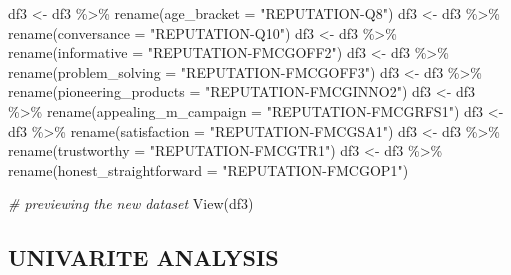 \documentclass[
]{article}
\newenvironment{Shaded}{\begin{snugshade}}{\end{snugshade}}
\newcommand{\AttributeTok}[1]{\textcolor[rgb]{0.77,0.63,0.00}{#1}}
\newcommand{\CommentTok}[1]{\textcolor[rgb]{0.56,0.35,0.01}{\textit{#1}}}
\newcommand{\FunctionTok}[1]{\textcolor[rgb]{0.00,0.00,0.00}{#1}}
\newcommand{\NormalTok}[1]{#1}
\newcommand{\OtherTok}[1]{\textcolor[rgb]{0.56,0.35,0.01}{#1}}
\newcommand{\SpecialCharTok}[1]{\textcolor[rgb]{0.00,0.00,0.00}{#1}}
\newcommand{\StringTok}[1]{\textcolor[rgb]{0.31,0.60,0.02}{#1}}
\begin{document}
\begin{Shaded}
\begin{Highlighting}[]
\NormalTok{df3 }\OtherTok{\textless{}{-}}\NormalTok{ df3 }\SpecialCharTok{\%\textgreater{}\%} \FunctionTok{rename}\NormalTok{(}\AttributeTok{age\_bracket =} \StringTok{"REPUTATION{-}Q8"}\NormalTok{)}
\NormalTok{df3 }\OtherTok{\textless{}{-}}\NormalTok{ df3 }\SpecialCharTok{\%\textgreater{}\%} \FunctionTok{rename}\NormalTok{(}\AttributeTok{conversance =} \StringTok{"REPUTATION{-}Q10"}\NormalTok{)}
\NormalTok{df3 }\OtherTok{\textless{}{-}}\NormalTok{ df3 }\SpecialCharTok{\%\textgreater{}\%} \FunctionTok{rename}\NormalTok{(}\AttributeTok{informative =} \StringTok{"REPUTATION{-}FMCGOFF2"}\NormalTok{)}
\NormalTok{df3 }\OtherTok{\textless{}{-}}\NormalTok{ df3 }\SpecialCharTok{\%\textgreater{}\%} \FunctionTok{rename}\NormalTok{(}\AttributeTok{problem\_solving =} \StringTok{"REPUTATION{-}FMCGOFF3"}\NormalTok{)}
\NormalTok{df3 }\OtherTok{\textless{}{-}}\NormalTok{ df3 }\SpecialCharTok{\%\textgreater{}\%} \FunctionTok{rename}\NormalTok{(}\AttributeTok{pioneering\_products =} \StringTok{"REPUTATION{-}FMCGINNO2"}\NormalTok{)}
\NormalTok{df3 }\OtherTok{\textless{}{-}}\NormalTok{ df3 }\SpecialCharTok{\%\textgreater{}\%} \FunctionTok{rename}\NormalTok{(}\AttributeTok{appealing\_m\_campaign =} \StringTok{"REPUTATION{-}FMCGRFS1"}\NormalTok{)}
\NormalTok{df3 }\OtherTok{\textless{}{-}}\NormalTok{ df3 }\SpecialCharTok{\%\textgreater{}\%} \FunctionTok{rename}\NormalTok{(}\AttributeTok{satisfaction =} \StringTok{"REPUTATION{-}FMCGSA1"}\NormalTok{)}
\NormalTok{df3 }\OtherTok{\textless{}{-}}\NormalTok{ df3 }\SpecialCharTok{\%\textgreater{}\%} \FunctionTok{rename}\NormalTok{(}\AttributeTok{trustworthy =} \StringTok{"REPUTATION{-}FMCGTR1"}\NormalTok{)}
\NormalTok{df3 }\OtherTok{\textless{}{-}}\NormalTok{ df3 }\SpecialCharTok{\%\textgreater{}\%} \FunctionTok{rename}\NormalTok{(}\AttributeTok{honest\_straightforward =} \StringTok{"REPUTATION{-}FMCGOP1"}\NormalTok{)}
\end{Highlighting}
\end{Shaded}

\begin{Shaded}
\begin{Highlighting}[]
\CommentTok{\# previewing the new dataset}
\FunctionTok{View}\NormalTok{(df3)}
\end{Highlighting}
\end{Shaded}

\hypertarget{univarite-analysis}{%
\subsection{UNIVARITE ANALYSIS}\label{univarite-analysis}}
\end{document}
